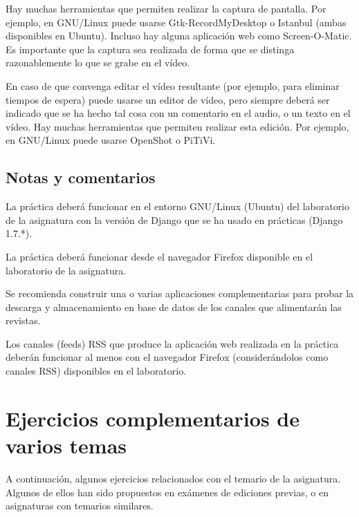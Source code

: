 Hay muchas herramientas que permiten realizar la captura de pantalla. Por ejemplo, en GNU/Linux puede usarse Gtk-RecordMyDesktop o Istanbul (ambas disponibles en Ubuntu). Incluso hay alguna aplicación web como Screen-O-Matic. Es importante que la captura sea realizada de forma que se distinga razonablemente lo que se grabe en el vídeo.

En caso de que convenga editar el vídeo resultante (por ejemplo, para eliminar tiempos de espera) puede usarse un editor de vídeo, pero siempre deberá ser indicado que se ha hecho tal cosa con un comentario en el audio, o un texto en el vídeo. Hay muchas herramientas que permiten realizar esta edición. Por ejemplo, en GNU/Linux puede usarse OpenShot o PiTiVi.

\subsection{Notas y comentarios}

La práctica deberá funcionar en el entorno GNU/Linux (Ubuntu) del laboratorio de la asignatura con la versión de Django que se ha usado en prácticas (Django 1.7.*).

La práctica deberá funcionar desde el navegador Firefox disponible en el laboratorio de la asignatura.

Se recomienda construir una o varias aplicaciones complementarias para probar la descarga y almacenamiento en base de datos de los canales que alimentarán las revistas.

Los canales (feeds) RSS que produce la aplicación web realizada en la práctica deberán funcionar al menos con el navegador Firefox (considerándolos como canales RSS) disponibles en el laboratorio.


\newpage




\section{Ejercicios complementarios de varios temas}

A continuación, algunos ejercicios relacionados con el temario de la asignatura. Algunos de ellos han sido propuestos en exámenes de ediciones previas, o en asignaturas con temarios similares.

